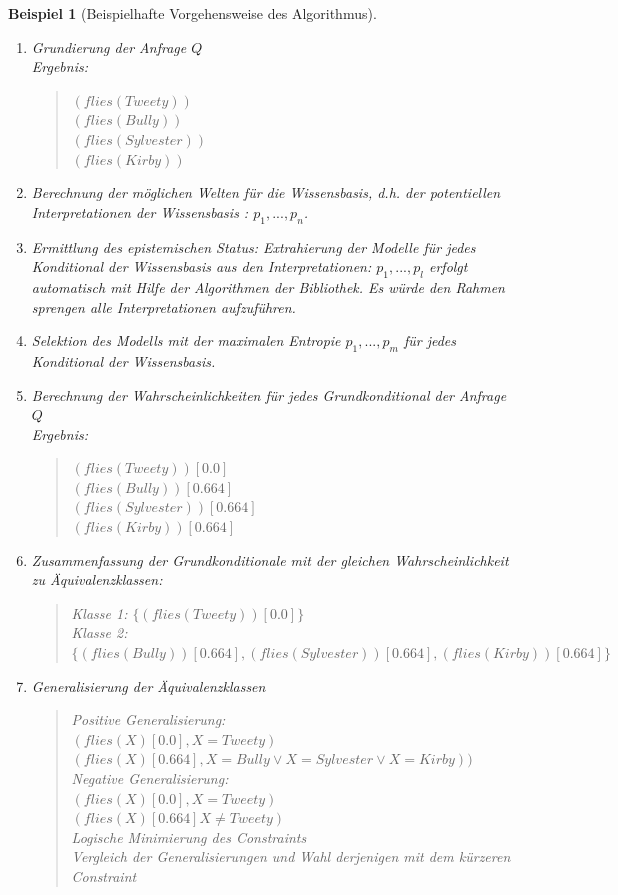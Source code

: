 \documentclass[a4paper, 11pt]{book}
\newtheorem{Bsp}{Beispiel}[section]
\begin{document}
\begin{Bsp}[Beispielhafte Vorgehensweise des Algorithmus]
\begin{enumerate}
		\item Grundierung der Anfrage $ Q $\\
		Ergebnis:
		\begin{quote}
			$ (flies(Tweety))$\\
			$ (flies(Bully))$\\
			$ (flies(Sylvester))$\\
			$ (flies(Kirby))$\\
		\end{quote}
		\item Berechnung der möglichen Welten für die Wissensbasis, d.h. der potentiellen Interpretationen der Wissensbasis : $ p_1, ..., p_n $.
		\item Ermittlung des epistemischen Status: Extrahierung der Modelle für jedes Konditional der Wissensbasis aus den Interpretationen: $ p_1, ..., p_l $ erfolgt automatisch mit Hilfe der Algorithmen der Bibliothek. Es würde den Rahmen sprengen alle Interpretationen aufzuführen.\\
		\item Selektion des Modells mit der maximalen Entropie $p_1, ..., p_m$ für jedes Konditional der Wissensbasis.
		\item Berechnung der Wahrscheinlichkeiten für jedes Grundkonditional der Anfrage $ Q $\\
		Ergebnis:
		\begin{quote}
			$(flies(Tweety))[0.0]$\\
			$(flies(Bully))[0.664]$\\
			$(flies(Sylvester))[0.664]$\\
			$(flies(Kirby))[0.664]$
		\end{quote}
		\item Zusammenfassung der Grundkonditionale mit der gleichen Wahrscheinlichkeit zu Äquivalenzklassen:
		
		\begin{quote}
			Klasse 1: $\{(flies(Tweety))[0.0]\}$\\
			Klasse 2: $\{(flies(Bully))[0.664], (flies(Sylvester))[0.664], (flies(Kirby))[0.664]\}$
		\end{quote}
		
		\item Generalisierung der Äquivalenzklassen
		\begin{quote}
			
			
			Positive Generalisierung:\\  
			$ (flies(X)[0.0], X=Tweety) $\\
			$ (flies(X)[0.664], X=Bully \lor  X=Sylvester \lor X=Kirby)) $\\
			Negative Generalisierung:\\  
			$ (flies(X)[0.0], X=Tweety) $\\
			$ (flies(X)[0.664] X \neq Tweety) $\\
			Logische Minimierung des Constraints\\
			Vergleich der Generalisierungen und Wahl derjenigen mit dem kürzeren Constraint\\
		\end{quote}
	\end{enumerate}
	

\end{Bsp}
\end{document}
